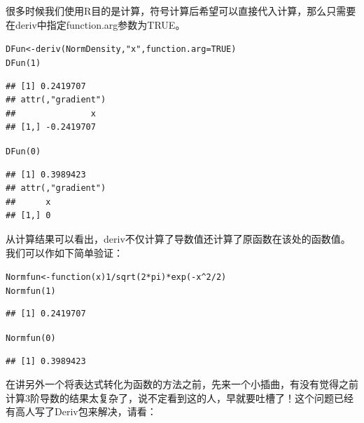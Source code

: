 \documentclass[a4paper]{ctexart}\usepackage[]{graphicx}\usepackage[]{color}
\makeatletter
\newcommand{\hlnum}[1]{\textcolor[rgb]{0.502,0.086,1}{#1}}%
\newcommand{\hlstr}[1]{\textcolor[rgb]{1,0.4,0.2}{#1}}%
\newcommand{\hlopt}[1]{\textcolor[rgb]{0.251,0.251,0.251}{#1}}%
\newcommand{\hlstd}[1]{\textcolor[rgb]{0.251,0.251,0.251}{#1}}%
\newcommand{\hlkwa}[1]{\textcolor[rgb]{0.941,0.188,0.816}{#1}}%
\newcommand{\hlkwb}[1]{\textcolor[rgb]{0,0.439,0.902}{#1}}%
\newcommand{\hlkwc}[1]{\textcolor[rgb]{0.188,0.941,0.314}{#1}}%
\newcommand{\hlkwd}[1]{\textcolor[rgb]{0.69,0.188,0.941}{#1}}%
\newenvironment{kframe}{%
 \def\at@end@of@kframe{}%
 \ifinner\ifhmode%
  \def\at@end@of@kframe{\end{minipage}}%
  \begin{minipage}{\columnwidth}%
 \fi\fi%
 \def\FrameCommand##1{\hskip\@totalleftmargin \hskip-\fboxsep
 \colorbox{shadecolor}{##1}\hskip-\fboxsep
     \hskip-\linewidth \hskip-\@totalleftmargin \hskip\columnwidth}%
 \MakeFramed {\advance\hsize-\width
   \@totalleftmargin\z@ \linewidth\hsize
   \@setminipage}}%
 {\par\unskip\endMakeFramed%
 \at@end@of@kframe}
\newenvironment{knitrout}{}{} %
\makeatother
\begin{document}
很多时候我们使用R目的是计算，符号计算后希望可以直接代入计算，那么只需要在deriv中指定function.arg参数为TRUE。
\begin{knitrout}
\color{fgcolor}\begin{kframe}
\begin{alltt}
\hlstd{DFun}\hlkwb{<-}\hlkwd{deriv}\hlstd{(NormDensity,}\hlstr{"x"}\hlstd{,}\hlkwc{function.arg} \hlstd{=} \hlnum{TRUE}\hlstd{)}
\hlkwd{DFun}\hlstd{(}\hlnum{1}\hlstd{)}
\end{alltt}
\begin{verbatim}
## [1] 0.2419707
## attr(,"gradient")
##               x
## [1,] -0.2419707
\end{verbatim}
\begin{alltt}
\hlkwd{DFun}\hlstd{(}\hlnum{0}\hlstd{)}
\end{alltt}
\begin{verbatim}
## [1] 0.3989423
## attr(,"gradient")
##      x
## [1,] 0
\end{verbatim}
\end{kframe}
\end{knitrout}
从计算结果可以看出，deriv不仅计算了导数值还计算了原函数在该处的函数值。我们可以作如下简单验证：
\begin{knitrout}
\color{fgcolor}\begin{kframe}
\begin{alltt}
\hlstd{Normfun}\hlkwb{<-}\hlkwa{function}\hlstd{(}\hlkwc{x}\hlstd{)} \hlnum{1}\hlopt{/}\hlkwd{sqrt}\hlstd{(}\hlnum{2}\hlopt{*}\hlstd{pi)}\hlopt{*}\hlkwd{exp}\hlstd{(}\hlopt{-}\hlstd{x}\hlopt{^}\hlnum{2}\hlopt{/}\hlnum{2}\hlstd{)}
\hlkwd{Normfun}\hlstd{(}\hlnum{1}\hlstd{)}
\end{alltt}
\begin{verbatim}
## [1] 0.2419707
\end{verbatim}
\begin{alltt}
\hlkwd{Normfun}\hlstd{(}\hlnum{0}\hlstd{)}
\end{alltt}
\begin{verbatim}
## [1] 0.3989423
\end{verbatim}
\end{kframe}
\end{knitrout}
在讲另外一个将表达式转化为函数的方法之前，先来一个小插曲，有没有觉得之前计算3阶导数的结果太复杂了，说不定看到这的人，早就要吐槽了！这个问题已经有高人写了Deriv包\cite{R-Deriv}来解决，请看：
\end{document}
